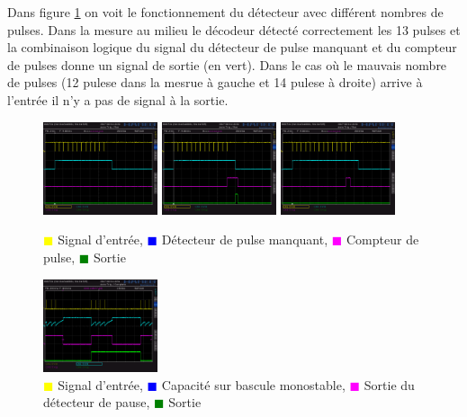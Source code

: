 \documentclass[french]{layout/Report}
\begin{document}
Dans figure \ref{fig:decoder_signal} on voit le fonctionnement du détecteur avec différent nombres de pulses.
Dans la mesure au milieu le décodeur détecté correctement les 13 pulses et la combinaison logique
du signal du détecteur de pulse manquant et du compteur de pulses donne un signal de sortie (en vert).
Dans le cas où le mauvais nombre  de pulses (12 pulese dans la mesrue à gauche et 14 pulese à droite)
arrive à l'entrée il n'y a pas de signal à la sortie.

\begin{figure}[h]
\centering
\includegraphics[width=0.3\textwidth]{../measurements/SCR06}
\includegraphics[width=0.3\textwidth]{../measurements/SCR07}
\includegraphics[width=0.3\textwidth]{../measurements/SCR08}
\caption{
\textcolor{yellow}{$\blacksquare$} Signal d'entrée,
\textcolor{blue}{$\blacksquare$} Détecteur de pulse manquant,
\textcolor{magenta}{$\blacksquare$} Compteur de pulse,
\textcolor{green}{$\blacksquare$} Sortie
}
\label{fig:decoder_signal}
\end{figure}

\begin{figure}[h]{}
\centering
\includegraphics[width=0.3\textwidth]{../measurements/SCR12}
\caption{
\textcolor{yellow}{$\blacksquare$} Signal d'entrée,
\textcolor{blue}{$\blacksquare$} Capacité sur bascule monostable,
\textcolor{magenta}{$\blacksquare$} Sortie du détecteur de pause,
\textcolor{green}{$\blacksquare$} Sortie
}
\label{fig:output_signal}
\end{figure}
\end{document}
